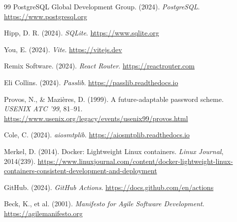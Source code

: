 \documentclass[12pt,a4paper]{report}
\begin{document}
{\begin{thebibliography}{99}
PostgreSQL Global Development Group. (2024). \textit{PostgreSQL}. \url{https://www.postgresql.org}

Hipp, D. R. (2024). \textit{SQLite}. \url{https://www.sqlite.org}

You, E. (2024). \textit{Vite}. \url{https://vitejs.dev}

Remix Software. (2024). \textit{React Router}. \url{https://reactrouter.com}

Eli Collins. (2024). \textit{Passlib}. \url{https://passlib.readthedocs.io}

Provos, N., \& Mazières, D. (1999). A future-adaptable password scheme. \textit{USENIX ATC '99}, 81--91. \url{https://www.usenix.org/legacy/events/usenix99/provos.html}

Cole, C. (2024). \textit{aiosmtplib}. \url{https://aiosmtplib.readthedocs.io}

Merkel, D. (2014). Docker: Lightweight Linux containers. \textit{Linux Journal}, 2014(239). \url{https://www.linuxjournal.com/content/docker-lightweight-linux-containers-consistent-development-and-deployment}

GitHub. (2024). \textit{GitHub Actions}. \url{https://docs.github.com/en/actions}

Beck, K., et al. (2001). \textit{Manifesto for Agile Software Development}. \url{https://agilemanifesto.org}

\end{thebibliography}
}
\end{document}
